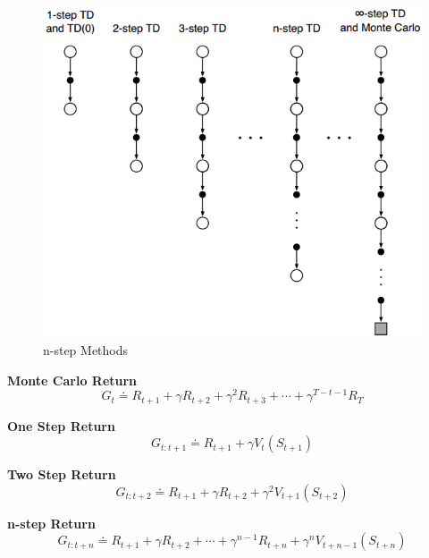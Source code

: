 \documentclass{article}
\begin{document}
\begin{figure}[h]
\includegraphics[scale=0.3]{nstep}
\centering
\caption{n-step Methods}
\end{figure}

\noindent
\textbf{Monte Carlo Return}
\begin{equation}
G_{t} \doteq R_{t+1}+\gamma R_{t+2}+\gamma^{2} R_{t+3}+\cdots+\gamma^{T-t-1} R_{T}
\end{equation}

\noindent
\textbf{One Step Return}
\begin{equation}
G_{t: t+1} \doteq R_{t+1}+\gamma V_{t}\left(S_{t+1}\right)
\end{equation}

\noindent
\textbf{Two Step Return}
\begin{equation}
G_{t: t+2} \doteq R_{t+1}+\gamma R_{t+2}+\gamma^{2} V_{t+1}\left(S_{t+2}\right)
\end{equation}

\noindent
\textbf{n-step Return}
\begin{equation}
G_{t: t+n} \doteq R_{t+1}+\gamma R_{t+2}+\cdots+\gamma^{n-1} R_{t+n}+\gamma^{n} V_{t+n-1}\left(S_{t+n}\right)
\end{equation}
\end{document}
